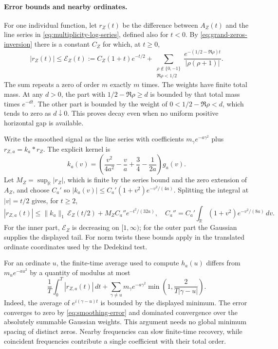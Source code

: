\documentclass[11pt]{amsart}
\theoremstyle{definition}
\theoremstyle{remark}
\numberwithin{equation}{section}
\begin{document}
\paragraph{Error bounds and nearby ordinates.}
For one individual function, let \(r_Z(t)\) be the difference
between \(A_Z(t)\) and the line series in
\eqref{eq:multiplicity-log-series}, defined also for \(t<0\).
By \eqref{eq:grand-zeros-inversion} there is a constant \(C_Z\)
for which, at \(t\ge0\),
\[
 |r_Z(t)|\leq\mathcal E_Z(t):=
 C_Z(1+t)e^{-t/2}
 +\sum_{\substack{\rho\notin\{0,-1\}\\\Re\rho<1/2}}
  \frac{e^{-(1/2-\Re\rho)t}}{|\rho(\rho+1)|}.
\]
The sum repeats a zero of order \(m\) exactly \(m\) times.
The weights have finite total mass. At any \(d>0\), the part
with \(1/2-\Re\rho\ge d\) is bounded by that total mass times
\(e^{-dt}\). The other part is bounded by the weight of
\(0<1/2-\Re\rho<d\), which tends to zero as \(d\downarrow0\).
This proves decay even when no uniform positive horizontal gap
is available.

Write the smoothed signal as the line series with coefficients
\(m_\gamma e^{-a\gamma^2}\) plus \(r_{Z,a}=k_a*r_Z\).
The explicit kernel is
\[
 k_a(v)=\left(\frac{v^2}{4a^2}-\frac{v}{a}
                +\frac34-\frac1{2a}\right)g_a(v).
\]
Let \(M_Z=\sup_{\mathbb R}|r_Z|\), which is finite by the
series bound and the zero extension of \(A_Z\), and choose
\(C_a'\) so \(|k_a(v)|\le C_a'(1+v^2)e^{-v^2/(4a)}\).
Splitting the integral at \(|v|=t/2\) gives, for \(t\ge2\),
\begin{equation}\label{eq:smoothing-error}
 |r_{Z,a}(t)|
 \leq \|k_a\|_1\,\mathcal E_Z(t/2)
       +M_Z C_a''e^{-t^2/(32a)},
 \quad
 C_a''=C_a'\int_{\mathbb R}(1+v^2)e^{-v^2/(8a)}\,dv.
\end{equation}
For the inner part, \(\mathcal E_Z\) is decreasing on
\([1,\infty)\); for the outer part the Gaussian supplies the
displayed tail. For norm twists these bounds apply in the
translated ordinate coordinates used by the Dedekind test.

For an ordinate \(u\), the finite-time average used to compute
\(h_a(u)\) differs from \(m_u e^{-au^2}\) by a quantity of modulus
at most
\[
 \frac{1}{T}\int_0^T|r_{Z,a}(t)|\,dt
 +\sum_{\gamma\ne u}m_\gamma e^{-a\gamma^2}
       \min\!\left(1,\frac{2}{T|\gamma-u|}\right).
\]
Indeed, the average of \(e^{i(\gamma-u)t}\) is bounded by
the displayed minimum. The error converges to zero by
\eqref{eq:smoothing-error} and dominated convergence over the
absolutely summable Gaussian weights. This argument needs no
global minimum spacing of distinct zeros. Nearby frequencies
can slow finite-time recovery, while coincident frequencies
contribute a single coefficient with their total order.
\end{document}
